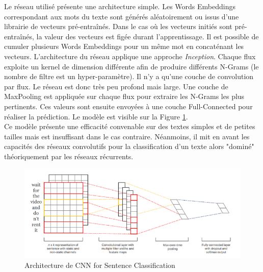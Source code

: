 \noindent Le réseau utilisé présente une architecture simple. Les Words Embeddings correspondant aux mots du texte sont générés aléatoirement ou issus d'une librairie de vecteurs pré-entraînés. Dans le cas où les vecteurs initiés sont pré-entraînés, la valeur des vecteurs est figée durant l'apprentissage. Il est possible de cumuler plusieurs Words Embeddings pour un même mot en concaténant les vecteurs. L'architecture du réseau applique une approche \textit{Inception}. Chaque flux exploite un kernel de dimension différente afin de produire différents N-Grams (le nombre de filtre est un hyper-paramètre). Il n'y a qu'une couche de convolution par flux. Le réseau est donc très peu profond mais large. Une couche de MaxPooling est appliquée sur chaque flux pour extraire les N-Grams les plus pertinents. Ces valeurs sont ensuite envoyées à une couche Full-Connected pour réaliser la prédiction. Le modèle est visible sur la Figure \ref{cnnsent}. \\

\noindent Ce modèle présente une efficacité convenable sur des textes simples et de petites tailles mais est insuffisant dans le cas contraire. Néanmoins, il mit en avant les capacités des réseaux convolutifs pour la classification d'un texte alors "dominé" théoriquement par les réseaux récurrents.

\begin{figure}
\centering
\includegraphics[scale=0.4]{./tex/natural-language-processing/cnnsent.png}
\caption{Architecture de CNN for Sentence Classification}
\label{cnnsent}
\end{figure}

